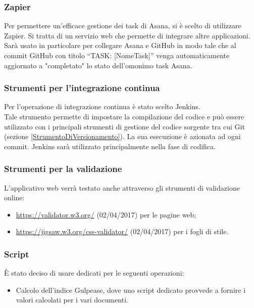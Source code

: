 \documentclass[../NormeDiProgetto.tex]{subfiles}
\begin{document}
			\subsubsection{Zapier}\label{Zapier}
				Per permettere un'efficace gestione dei task di Asana, si è scelto di utilizzare Zapier. Si tratta
				di un servizio web che permette di integrare altre applicazioni. Sarà usato in particolare per
				collegare Asana e GitHub in modo tale che al commit GitHub con titolo ``TASK: [NomeTask]''
				venga automaticamente aggiornato a "completato" lo stato dell'omonimo task Asana.
			\subsubsection{Strumenti per l'integrazione continua}\label{IntegrazioneContinua}
				Per l'operazione di integrazione continua è stato scelto Jenkins.\\
				Tale strumento permette di impostare la compilazione del codice e può essere utilizzato con
				i principali strumenti di gestione del codice sorgente tra cui Git (sezione
				\ref{StrumentoDiVersionamento}).
				La sua esecuzione è azionata ad ogni commit.
				Jenkins sarà utilizzato principalmente nella fase di codifica.
			\subsubsection{Strumenti per la validazione }
				L'applicativo web verrà testato anche attraverso gli strumenti di validazione online:
				\begin{itemize}
					\item \url{https://validator.w3.org/} (02/04/2017) per le pagine web;
					\item \url{https://jigsaw.w3.org/css-validator/} (02/04/2017) per i fogli di stile.
				\end{itemize}
			\subsubsection{Script}
				È stato deciso di usare  dedicati per le seguenti operazioni:
				\begin{itemize}
					\item Calcolo dell'indice Gulpease, dove uno script dedicato provvede a fornire i valori
					calcolati per i vari documenti.
				\end{itemize}
\end{document}
